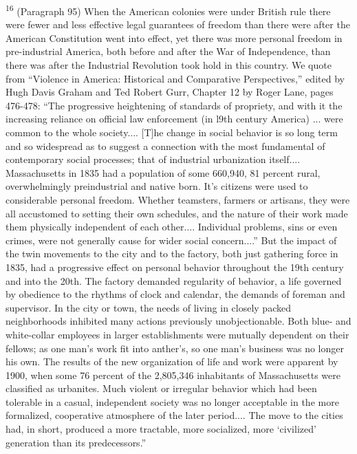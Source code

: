 \documentclass{article}
\begin{document}
\textsuperscript{16} (Paragraph 95) When the American colonies were under British rule there were fewer and less 
effective legal guarantees of freedom than there were after the American Constitution went into 
effect, yet there was more personal freedom in pre-industrial America, both before and after the 
War of Independence, than there was after the Industrial Revolution took hold in this 
country.  We quote from “Violence in America: Historical and Comparative Perspectives,” 
edited by Hugh Davis Graham and Ted Robert Gurr, Chapter 12 by Roger Lane, pages 476-478: 
“The progressive heightening of standards of propriety, and with it the increasing reliance on 
official law enforcement (in l9th century America) ... were common to the whole 
society....  [T]he change in social behavior is so long term and so widespread as to suggest a 
connection with the most fundamental of contemporary social processes; that of industrial 
urbanization itself....  Massachusetts in 1835 had a population of some 660,940, 81 percent rural, 
overwhelmingly preindustrial and native born.  It’s citizens were used to considerable personal 
freedom.  Whether teamsters, farmers or artisans, they were all accustomed to setting their own 
schedules, and the nature of their work made them physically independent of each 
other....  Individual problems, sins or even crimes, were not generally cause for wider social 
concern....” But the impact of the twin movements to the city and to the factory, both just 
gathering force in 1835, had a progressive effect on personal behavior throughout the 19th 
century and into the 20th.  The factory demanded regularity of behavior, a life governed by 
obedience to the rhythms of clock and calendar, the demands of foreman and supervisor.  In the 
city or town, the needs of living in closely packed neighborhoods inhibited many actions 
previously unobjectionable.  Both blue- and white-collar employees in larger establishments 
were mutually dependent on their fellows; as one man’s work fit into anther’s, so one man’s 
business was no longer his own.  The results of the new organization of life and work were 
apparent by 1900, when some 76 percent of the 2,805,346 inhabitants of Massachusetts were 
classified as urbanites.  Much violent or irregular behavior which had been tolerable in a casual, 
independent society was no longer acceptable in the more formalized, cooperative atmosphere of 
the later period....  The move to the cities had, in short, produced a more tractable, more 
socialized, more ‘civilized’ generation than its predecessors.”  \vspace{\baselineskip}
\end{document}
